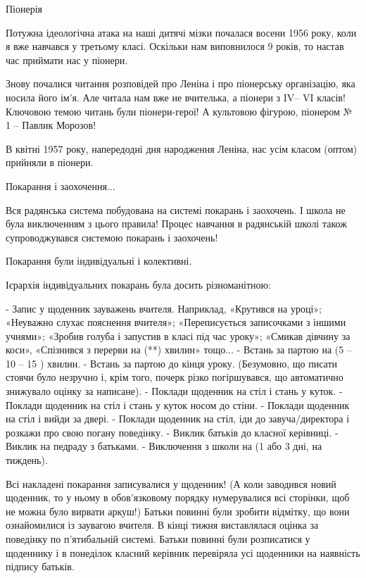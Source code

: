 Піонерія

Потужна ідеологічна атака на наші дитячі мізки почалася восени 1956 року, коли
я вже навчався у третьому класі. Оскільки нам виповнилося 9 років, то настав
час приймати нас у піонери.

Знову почалися читання розповідей про Леніна і про піонерську організацію, яка
носила його ім’я. Але читала нам вже не вчителька, а піонери з IV– VI класів!
Ключовою темою читань  були піонери-герої! А культовою фігурою, піонером № 1 –
Павлик Морозов!

В квітні 1957 року, напередодні дня народження Леніна, нас усім класом (оптом)
прийняли в піонери.

Покарання і заохочення...

Вся радянська система побудована на системі покарань і заохочень. І школа не
була виключенням з цього правила! Процес навчання в радянській школі також
супроводжувався системою покарань і заохочень!

Покарання були індивідуальні і колективні. 

Ієрархія індивідуальних покарань була досить різноманітною:

\obeycr
- Запис у щоденник зауважень вчителя. Наприклад, «Крутився на уроці»; «Неуважно слухає пояснення вчителя»; «Переписується записочками з іншими учнями»; «Зробив голуба і запустив в класі під час уроку»; «Смикав дівчину за коси», «Спізнився з перерви на (**) хвилин» тощо... 
- Встань за партою на (5 – 10 – 15 ) хвилин.
- Встань за партою до кінця уроку. 
(Безумовно, що писати стоячи було незручно і, крім того, почерк різко погіршувався, що автоматично знижувало оцінку за написане). 
- Поклади щоденник на стіл і стань у куток.
- Поклади щоденник на стіл і стань у куток носом до стіни.
- Поклади щоденник на стіл і вийди за двері.
- Поклади щоденник на стіл, іди до завуча/директора і розкажи про свою погану поведінку.
- Виклик батьків до класної керівниці.
- Виклик на педраду з батьками.
- Виключення з школи на (1 або 3 дні, на тиждень). 
\restorecr

Всі накладені покарання записувалися у щоденник! (А коли заводився новий
щоденник, то у ньому в обов’язковому порядку нумерувалися всі сторінки, щоб не
можна було вирвати аркуш!) Батьки повинні були зробити відмітку, що вони
ознайомилися із заувагою вчителя. В кінці тижня виставлялася оцінка за
поведінку по п’ятибальній системі. Батьки повинні були розписатися у щоденнику
і в понеділок класний керівник перевіряла усі щоденники на наявність підпису
батьків.

